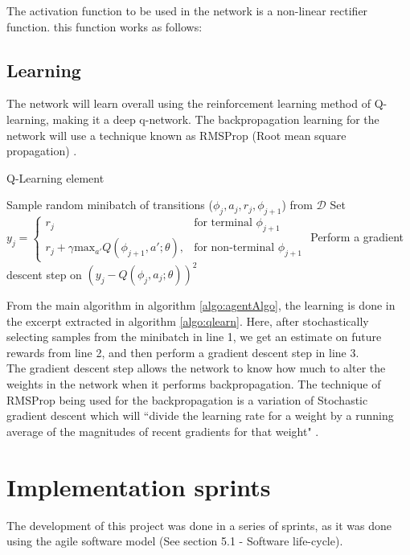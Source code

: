 \documentclass[10pt]{article}
\begin{document}
		The activation function to be used in the network is a non-linear rectifier function. this function works as follows:
		
	\medskip
	
	\subsection{Learning}
		The network will learn overall using the reinforcement learning method of Q-learning, making it a deep q-network. The backpropagation learning for the network will use a technique known as RMSProp (Root mean square propagation) \cite{rms}.
		\begin{algorithm}
			\caption{Q-Learning element \cite{humanlevel}}
			\label{algo:qlearn}
			\begin{algorithmic}[1]
				\State Sample random minibatch of transitions ($\phi_j,a_j,r_j,\phi_{j+1}$) from $\mathcal{D}$
				\State Set $y_j =
					\begin{cases}
   						r_j& \text{for terminal } \phi_{j+1}\\
    					r_j + \gamma \text{max}_{a'}Q(\phi_{j+1},a';\theta),& \text{for non-terminal } \phi_{j+1}
					\end{cases}$
				\State Perform a gradient descent step on $(y_j - Q(\phi_j,a_j;\theta))^2$
			\end{algorithmic}
		\end{algorithm}
		
		From the main algorithm in algorithm \ref{algo:agentAlgo}, the learning is done in the excerpt extracted in algorithm \ref{algo:qlearn}. Here, after stochastically selecting samples from the minibatch in line 1, we get an estimate on future rewards from line 2, and then perform a gradient descent step in line 3.\\
		
		The gradient descent step allows the network to know how much to alter the weights in the network when it performs backpropagation. The technique of RMSProp being used for the backpropagation is a variation of Stochastic gradient descent which will ``divide the learning rate for a weight by a running average of the magnitudes of recent gradients for that weight" \cite{rms}.
	
	\bigskip

\section{Implementation sprints}
	The development of this project was done in a series of sprints, as it was done using the agile software model (See section 5.1 - Software life-cycle).
	
\end{document}
